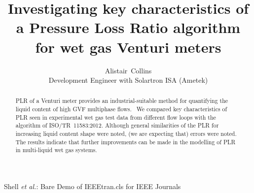 \documentclass[journal]{IEEEtran}
\begin{document}
%
\title{Investigating key characteristics of a Pressure Loss Ratio algorithm for wet gas Venturi meters
}
%
%
%

\author{Alistair~Collins\\
Development Engineer with Solartron ISA (Ametek)
}


%
{Shell \MakeLowercase{\textit{et al.}}: Bare Demo of IEEEtran.cls for IEEE Journals}
% 











\maketitle

\begin{abstract}
\acrfull{PLR} of a Venturi meter provides an industrial-suitable method for quantifying the liquid content of high \acrshort{GVF} multiphase flows.  We compared key characteristics of \acrshort{PLR} seen in experimental wet gas test data from different flow loops with the algorithm of ISO/TR~11583:2012. Although general similarities of the \acrshort{PLR} for increasing liquid content shape were noted, (we are expecting that) errors were noted. The results indicate that further improvements can be made in the modelling of \acrshort{PLR} in multi-liquid wet gas systems.
\end{abstract}
\end{document}
